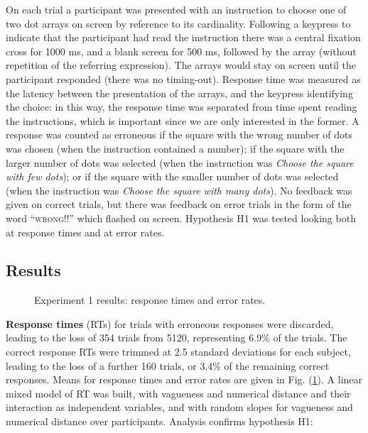 \documentclass[%
man,		%
floatsintext,%
apacite%
]{apa6}
\begin{document}
On each trial a participant was presented with an instruction to choose one of two dot arrays on screen by reference to its cardinality. 
Following a keypress to indicate that the participant had read the instruction there was a central fixation cross for 1000 ms, and a blank screen for 500 ms, followed by the array (without repetition of the referring expression). 
The arrays would stay on screen until the participant responded (there was no timing-out). 
Response time was measured as the latency between the presentation of the arrays, and the keypress identifying the choice: in this way, the response time was separated from time spent reading the instructions, which is important since we are only interested in the former. 
A response was counted as erroneous if the square with the wrong number of dots was chosen (when the instruction contained a number); 
if the square with the larger number of dots was selected (when the instruction was \emph{Choose the square with few dots}); 
or if the square with the smaller number of dots was selected (when the instruction was \emph{Choose the square with many dots}). 
No feedback was given on correct trials, but there was feedback on error trials in the form of the word ``\textsc{wrong!!}'' which flashed on screen. Hypothesis H1 was tested looking both at response times and at error rates.

\subsection{Results}

\begin{figure}[htbp]
\caption{Experiment 1 results: response times and error rates.}
\label{resultse1}
\end{figure}

{\bf Response times} (RTs) for trials with erroneous responses were discarded, leading to the loss of 354 trials from 5120, representing 6.9\% of the trials. 
The correct response RTs were trimmed at 2.5 standard deviations for each subject, leading to the loss of a further 160 trials, or 3.4\% of the remaining correct responses. 
Means for response times and error rates are given in Fig. (\ref{resultse1}).
A linear mixed model of RT was built, with vagueness and numerical distance and their interaction as independent variables, and with random slopes for vagueness and numerical distance over participants. Analysis confirms hypothesis H1:
\end{document}
